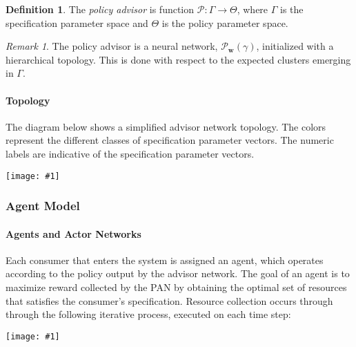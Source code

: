 \documentclass{article}
\theoremstyle{definition}
\newtheorem{definition}{Definition}[section]
\theoremstyle{remark}
\newtheorem*{remark}{Remark}
\newcommand{\addpic}[1]{\texttt{[image: \#1]}}
\begin{document}
			\begin{definition}
				The \emph{policy advisor} is function $\mathcal{P}: \Gamma \rightarrow \Theta$, where $\Gamma$ is the specification parameter space and $\Theta$ is the policy parameter space.
			\end{definition}

			\begin{remark}
				The policy advisor is a neural network, $\mathcal{P}_{\mathbf{w}}(\gamma)$, initialized with a hierarchical topology. This is done with respect to the expected clusters emerging in $\Gamma$.
			\end{remark}


				\paragraph{Topology}

				The diagram below shows a simplified advisor network topology. The colors represent the different classes of specification parameter vectors. The numeric labels are indicative of the specification parameter vectors.

				\addpic{figures/advisor_topology.png}

		\subsubsection{Agent Model}
		
			\paragraph{Agents and Actor Networks}

			Each consumer that enters the system is assigned an agent, which operates according to the policy output by the advisor network. The goal of an agent is to maximize reward collected by the PAN by obtaining the optimal set of resources that satisfies the consumer's specification. Resource collection occurs through through the following iterative process, executed on each time step:
			
			\addpic{figures/actor_network}
\end{document}

